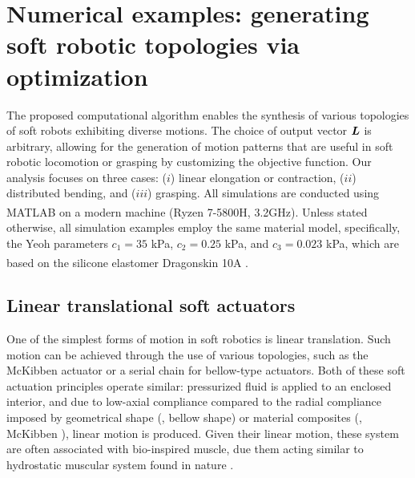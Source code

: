 \section[Numerical examples: generating soft robotic topologies]{Numerical examples: generating soft robotic topologies via optimization}
\label{sec:C1:results}
The proposed computational algorithm enables the synthesis of various topologies of soft robots exhibiting diverse motions. The choice of output vector ${\boldsymbol{L}}$ is arbitrary, allowing for the generation of motion patterns that are useful in soft robotic locomotion or grasping by customizing the objective function. Our analysis focuses on three cases: ($i$) linear elongation or contraction, ($ii$) distributed bending, and ($iii$) grasping. All simulations are conducted using MATLAB\textsuperscript{\scriptsize\textregistered} on a modern machine (Ryzen 7-5800H, 3.2GHz). Unless stated otherwise, all simulation examples employ the same material model, specifically, the Yeoh parameters $c_1 = 35$ kPa, $c_2 = 0.25$ kPa, and $c_3 = 0.023$ kPa, which are based on the silicone elastomer Dragonskin 10A\textsuperscript{\scriptsize\texttrademark\!} \cite{Xavier2022Jun}.

\subsection{Linear translational soft actuators}
One of the simplest forms of motion in soft robotics is linear translation. Such motion can be achieved through the use of various topologies, such as the McKibben actuator or a serial chain for bellow-type actuators. Both of these soft actuation principles operate similar: pressurized fluid is applied to an enclosed interior, and due to low-axial compliance compared to the radial compliance imposed by geometrical shape (\eg, bellow shape) or material composites (\eg, McKibben \cite{Paynter1974,Paynter1988}), linear motion is produced.  Given their linear motion, these system are often associated with bio-inspired muscle, due them acting similar to hydrostatic muscular system found in nature \cite{Kier1985}. 
 
